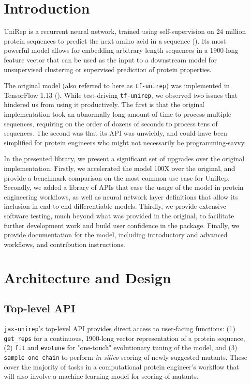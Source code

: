 \documentclass[twoside,11pt]{article}
\begin{document}
\section{Introduction}

UniRep is a recurrent neural network,
trained using self-supervision
on 24 million protein sequences
to predict the next amino acid in a sequence (\cite{alley2019unified}).
Its most powerful model allows for embedding
arbitrary length sequences in a 1900-long feature vector
that can be used as the input to a downstream model
for unsupervised clustering or supervised prediction of protein properties.

The original model (also referred to here as \verb|tf-unirep|)
was implemented in TensorFlow 1.13 (\cite{abadi2016tensorflow}).
While test-driving \verb|tf-unirep|, we observed two issues
that hindered us from using it productively.
The first is that the original implementation
took an abnormally long amount of time to process multiple sequences,
requiring on the order of dozens of seconds to process tens of sequences.
The second was that its API was unwieldy,
and could have been simplified for protein engineers
who might not necessarily be programming-savvy.

In the presented library, we present a significant set of upgrades
over the original implementation.
Firstly, we accelerated the model 100X over the original,
and provide a benchmark comparison on the most common use case for UniRep.
Secondly, we added a library of APIs
that ease the usage of the model in protein engineering workflows,
as well as neural network layer definitions
that allow its inclusion in end-to-end differentiable models.
Thirdly, we provide extensive software testing,
much beyond what was provided in the original,
to facilitate further development work
and build user confidence in the package.
Finally, we provide documentation for the model,
including introductory and advanced workflows,
and contribution instructions.

\section{Architecture and Design}

\subsection{Top-level API}

\verb|jax-unirep|'s top-level API provides direct access
to user-facing functions:
(1) \verb|get_reps| for a continuous, 1900-long vector representation of a protein sequence,
(2) \verb|fit| and \verb|evotune| for "one-touch" evolutionary tuning of the model,
and
(3) \verb|sample_one_chain| to perform \textit{in silico} scoring of newly suggested mutants.
These cover the majority of tasks in a computational protein engineer's workflow
that will also involve a machine learning model for scoring of mutants.
\end{document}
